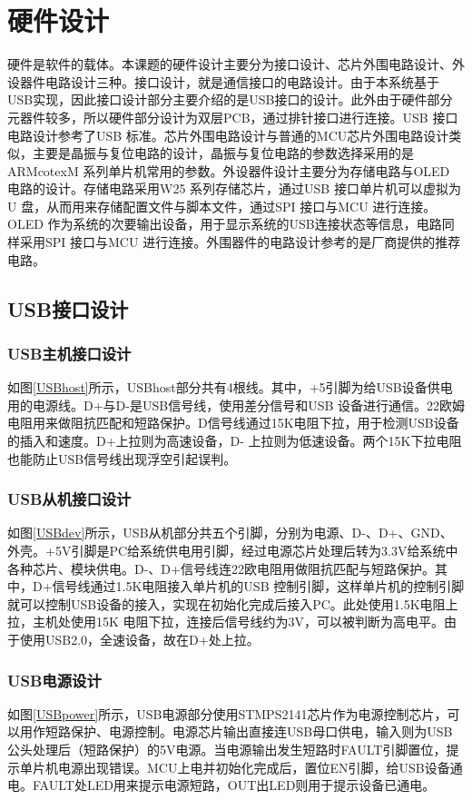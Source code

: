 
\chapter{硬件设计}

硬件是软件的载体。本课题的硬件设计主要分为接口设计、芯片外围电路设计、外设器件电路设计三种。接口设计，就是通信接口的电路设计。由于本系统基于USB实现，因此接口设计部分主要介绍的是USB接口的设计。此外由于硬件部分元器件较多，所以硬件部分设计为双层PCB，通过排针接口进行连接。USB 接口电路设计参考了USB 标准。芯片外围电路设计与普通的MCU芯片外围电路设计类似，主要是晶振与复位电路的设计，晶振与复位电路的参数选择采用的是ARMcotexM 系列单片机常用的参数。外设器件设计主要分为存储电路与OLED 电路的设计。存储电路采用W25 系列存储芯片，通过USB 接口单片机可以虚拟为U 盘，从而用来存储配置文件与脚本文件，通过SPI 接口与MCU 进行连接。OLED 作为系统的次要输出设备，用于显示系统的USB连接状态等信息，电路同样采用SPI 接口与MCU 进行连接。外围器件的电路设计参考的是厂商提供的推荐电路。
\section{USB接口设计}
\subsection{USB主机接口设计}
如图\ref{USBhost}所示，USBhost部分共有4根线。其中，+5引脚为给USB设备供电用的电源线。D+与D-是USB信号线，使用差分信号和USB 设备进行通信。22欧姆电阻用来做阻抗匹配和短路保护。D信号线通过15K电阻下拉，用于检测USB设备的插入和速度。D+上拉则为高速设备，D- 上拉则为低速设备。两个15K下拉电阻也能防止USB信号线出现浮空引起误判。
　　
\subsection{USB从机接口设计}
如图\ref{USBdev}所示，USB从机部分共五个引脚，分别为电源、D-、D+、GND、外壳。+5V引脚是PC给系统供电用引脚，经过电源芯片处理后转为3.3V给系统中各种芯片、模块供电。D-、D+信号线连22欧电阻用做阻抗匹配与短路保护。其中，D+信号线通过1.5K电阻接入单片机的USB 控制引脚，这样单片机的控制引脚就可以控制USB设备的接入，实现在初始化完成后接入PC。此处使用1.5K电阻上拉，主机处使用15K 电阻下拉，连接后信号线约为3V，可以被判断为高电平。由于使用USB2.0，全速设备，故在D+处上拉。

\subsection{USB电源设计}
如图\ref{USBpower}所示，USB电源部分使用STMPS2141芯片作为电源控制芯片，可以用作短路保护、电源控制。电源芯片输出直接连USB母口供电，输入则为USB公头处理后（短路保护）的5V电源。当电源输出发生短路时FAULT引脚置位，提示单片机电源出现错误。MCU上电并初始化完成后，置位EN引脚，给USB设备通电。FAULT处LED用来提示电源短路，OUT出LED则用于提示设备已通电。
